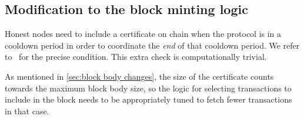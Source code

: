 \subsection{Modification to the block minting logic}\label{sec:modified block mint}

Honest nodes need to include a certificate on chain when the protocol is in a cooldown period in order to coordinate the \emph{end} of that cooldown period.
We refer to~\cite[Block creation]{peras-cip} for the precise condition.
This extra check is computationally trivial.

As mentioned in \cref{sec:block body changes}, the size of the certificate counts towards the maximum block body size, so the logic for selecting transactions to include in the block needs to be appropriately tuned to fetch fewer transactions in that case.



